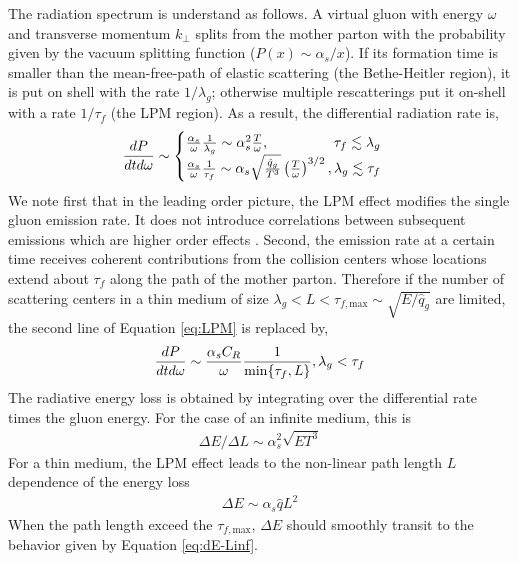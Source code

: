 \documentclass[aps, prc, reprint, amsmath, groupedaddress, nofootinbib]{revtex4-1}
\begin{document}
The radiation spectrum is understand as follows. 
A virtual gluon with energy $\omega$ and transverse momentum $k_\perp$ splits from the mother parton with the probability given by the vacuum splitting function ($P(x) \sim \alpha_s/x$).
If its formation time is smaller than the mean-free-path of elastic scattering (the Bethe-Heitler region), it is put on shell with the rate $1/\lambda_g$; otherwise multiple rescatterings put it on-shell with a rate $1/\tau_f$ (the LPM region).
As a result, the differential radiation rate is,
\begin{eqnarray}\label{eq:LPM}
\frac{dP}{dt d\omega} \sim \begin{cases}
 \frac{\alpha_s}{\omega} \frac{1}{\lambda_g} \sim \alpha_s^2  \frac{T}{\omega}, \hfill \tau_f \lesssim \lambda_g\\
 \frac{\alpha_s}{\omega} \frac{1}{\tau_f}\sim \alpha_s \sqrt{\frac{\hat{q}_g}{T^3}} \left(\frac{T}{\omega}\right)^{3/2}, \hfill \lambda_g \lesssim \tau_f
\end{cases}
\end{eqnarray}
We note first that in the leading order picture, the LPM effect modifies the single gluon emission rate. 
It does not introduce correlations between subsequent emissions which are higher order effects \cite{Arnold:2016jnq}.
Second, the emission rate at a certain time receives coherent contributions from the collision centers whose locations extend about $\tau_f$ along the path of the mother parton.
Therefore if the number of scattering centers in a thin medium of size $\lambda_g < L< \tau_{f,\textrm{max}} \sim \sqrt{E/\hat{q}_g}$ are limited, the second line of Equation \ref{eq:LPM} is replaced by,
\begin{eqnarray}
\frac{dP}{dt d\omega} \sim 
 \frac{\alpha_s C_R}{\omega} \frac{1}{\min\{\tau_f,L\}}, \hfill \lambda_g < \tau_f
\end{eqnarray}
The radiative energy loss is obtained by integrating over the differential rate times the gluon energy. 
For the case of an infinite medium, this is
\begin{eqnarray}\label{eq:dE-Linf}
\Delta E/\Delta L \sim \alpha_s^2 \sqrt{ET^3}
\end{eqnarray}
For a thin medium, the LPM effect leads to the non-linear path length $L$ dependence of the energy loss
\begin{eqnarray}\label{eq:dE-Lfinite}
\Delta E \sim \alpha_s \hat{q} L^2
\end{eqnarray}
When the path length exceed the $\tau_{f,\textrm{max}}$, $\Delta E$ should smoothly transit to the behavior given by Equation \ref{eq:dE-Linf}.
\end{document}
